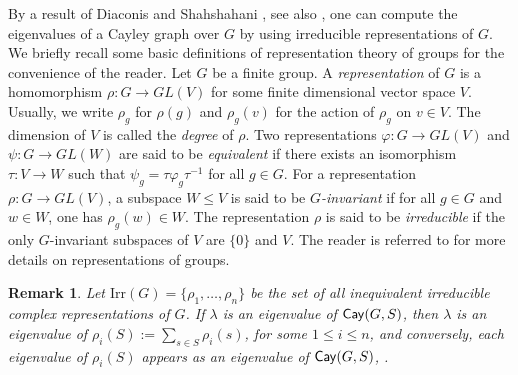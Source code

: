 \documentclass{amsart}
\newtheorem{rem}[thm]{Remark}
\def \leq {\leqslant}
\def\Cay{{\sf Cay}} \def\Ker{{\sf Ker}}
\begin{document}
By a result of Diaconis and Shahshahani \cite{DS}, see also \cite[Corollary 7]{AT}, one can compute the eigenvalues of a Cayley graph over $G$ by using  irreducible representations of $G$. We briefly recall some basic definitions of representation theory of groups for the convenience of the reader.  Let $G$ be a finite group. A {\em representation} of $G$ is a homomorphism $\rho:G\rightarrow GL(V)$ for some finite dimensional vector space $V$. Usually, we write $\rho_g$ for $\rho(g)$ and $\rho_g(v)$ for the action of $\rho_g$ on $v\in V$. The dimension of $V$ is called the {\em degree} of $\rho$.  Two representations $\varphi:G\rightarrow GL(V)$ and $\psi:G\rightarrow GL(W)$ are said to be {\em equivalent} if there exists an isomorphism $\tau:V\rightarrow W$ such that $\psi_g= \tau\varphi_g\tau^{-1}$ for all $g\in G$. For a representation $\rho:G\rightarrow GL(V)$, a subspace $W\leq  V$ is said to be {\em $G$-invariant} if for all $g\in G$ and $w\in W$, one has $\rho_g(w)\in W$. The representation
$\rho$ is said to be {\em irreducible} if the only $G$-invariant subspaces of $V$ are $\{0\}$ and $V$. The reader is referred to \cite{JL} for more details on representations of groups.


\begin{rem}\label{rep}
	Let $\textrm{Irr}(G)=\{\rho_1,\ldots,\rho_n\}$ be the set of all inequivalent irreducible complex representations of $G$. If $\lambda$ is an eigenvalue of $\Cay(G,S)$, then $\lambda$ is an eigenvalue of $\rho_i(S):=\sum_{s\in S}\rho_i(s)$, for some $1\leq i\leq n$, and conversely, each eigenvalue of $\rho_i(S)$ appears as an eigenvalue of $\Cay(G,S)$, \cite[Corollary 7]{AT}. 
\end{rem}
\end{document}
